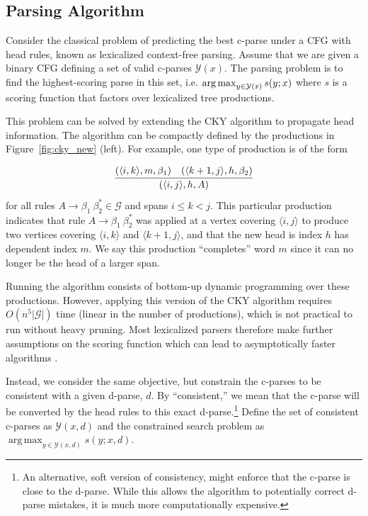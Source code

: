 \documentclass[11pt,letterpaper]{article}
\DeclareMathOperator*{\argmax}{arg\,max}
\newcommand{\rules}{\mathcal{G}}
\newcommand{\Span}[1]{\langle #1 \rangle}
\newcommand{\RuleB}[3]{#1 \rightarrow #2\ #3^*}
\begin{document}
\subsection{Parsing Algorithm}
Consider the classical problem of predicting the best c-parse under a
CFG with head rules, known as lexicalized context-free parsing.
Assume that we are given a binary CFG defining a set of valid c-parses
$\mathcal{Y}(x)$.  The parsing problem is to find the highest-scoring
parse in this set, i.e.  $ \argmax_{y \in {\cal Y}(x)} s(y;x) $ where
$s$ is a scoring function that factors over lexicalized tree
productions.

This problem can be solved by extending the CKY algorithm to propagate 
head information. The algorithm can be compactly defined by the
productions in Figure~\ref{fig:cky_new} (left). For example, one type of production is of 
the form

\[ \infer{(\Span{i, j}, h, A)}{(\Span{i, k}, m, \beta_1) & (\Span{k+1,
    j}, h, \beta_2)} \] for all rules $\RuleB{A}{\beta_1}{\beta_2}\in
\rules$ and spans $i \leq k < j$. This particular production indicates that
rule $\RuleB{A}{\beta_1}{\beta_2}$ was applied at a vertex covering
$\Span{i, j}$ to produce two vertices covering $\Span{i, k}$ and
$\Span{k+1, j}$, and that the new head is index $h$ has dependent
index $m$. We say this production ``completes'' word $m$ since it 
can no longer be the head of a larger span.

Running the algorithm consists of bottom-up dynamic programming over
these productions. However, applying this version of the CKY
algorithm requires $O(n^5 |\rules|)$ time (linear in the number of
productions), which is not practical to run without heavy pruning. 
Most lexicalized parsers therefore make further assumptions on the 
scoring function which can lead to asymptotically faster algorithms
\cite{eisner1999efficient}.

Instead, we consider the same objective, but constrain the c-parses to
be consistent with a given d-parse, $d$. By ``consistent,'' we mean that
the c-parse will be converted by the head rules to this exact
d-parse.\footnote{An alternative, soft version of consistency, might enforce that 
the c-parse is close to the d-parse. While this allows 
the algorithm to potentially correct d-parse mistakes, it is much more computationally expensive.} 
Define the set of consistent c-parses as $\mathcal{Y}(x,d)$
and the constrained search problem as
$ \argmax_{y \in \mathcal{Y}(x, d)} s(y; x, d)$.
\end{document}
